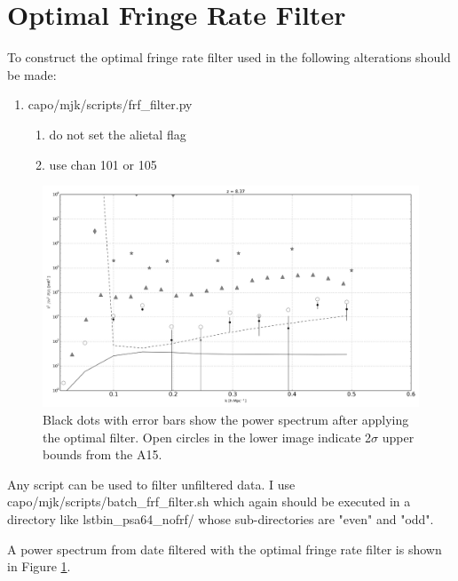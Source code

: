 \documentclass[onecolumn]{emulateapj}
\begin{document}
\section{Optimal Fringe Rate Filter}{
To construct the optimal fringe rate filter used in the following alterations should be made:

\begin{enumerate}

\item capo/mjk/scripts/frf\_filter.py
\begin{enumerate}
\item do not set the alietal flag
\item use chan 101 or 105
\end{enumerate}
\end{enumerate}
\begin{figure}[tb]
\centering
\includegraphics[width=.8\textwidth]{data/psa64_ali_reconstruction.png}
\caption{\label{fig:optimal_pspec} Black dots with error bars show the power spectrum after applying the optimal filter. Open circles in the lower image indicate 2$\sigma$ upper bounds from the A15.}
\end{figure}

Any script can be used to filter unfiltered data. I use capo/mjk/scripts/batch\_frf\_filter.sh which again should be executed in a directory like lstbin\_psa64\_nofrf/ whose sub-directories are "even" and "odd".

A power spectrum from date filtered with the optimal fringe rate filter is shown in Figure \ref{fig:optimal_pspec}.
}
\end{document}
